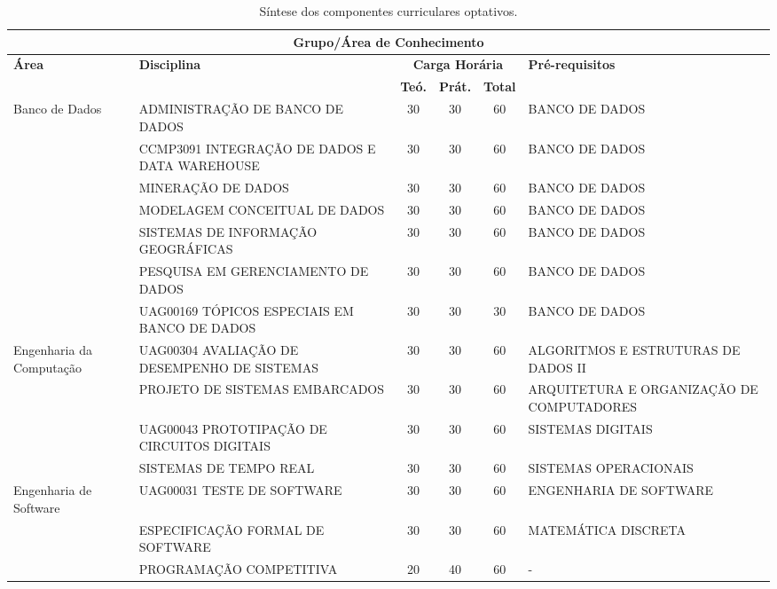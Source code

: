 \begin{center}
  
  \begin{tiny}
    \begin{longtable}{p{2.5cm}p{5.5cm}cccp{3.3cm}}
      \caption{\label{quadro:sintese-componentes-curriculares-optativos}Síntese dos componentes curriculares optativos.}\\
    \toprule
    \multicolumn{6}{c}{\textbf{Grupo/Área de Conhecimento}} \\ \midrule
    \textbf{Área} & \textbf{Disciplina} & \multicolumn{3}{c}{\textbf{Carga Horária}} & \textbf{Pré-requisitos} \\
    & & \textbf{Teó.} & \textbf{Prát.} & \textbf{Total} & \\
    \midrule
  Banco de Dados & ADMINISTRAÇÃO DE BANCO DE DADOS & 30 & 30 & 60 & BANCO DE DADOS \\ \cline{2-6}
    & CCMP3091 INTEGRAÇÃO DE DADOS E DATA WAREHOUSE & 30 & 30 & 60 & BANCO DE DADOS \\ \cline{2-6}
    & MINERAÇÃO DE DADOS & 30 & 30 & 60 & BANCO DE DADOS \\ \cline{2-6}
    & MODELAGEM CONCEITUAL DE DADOS & 30 & 30 & 60 & BANCO DE DADOS \\ \cline{2-6}
    & SISTEMAS DE INFORMAÇÃO GEOGRÁFICAS & 30 & 30 & 60 & BANCO DE DADOS \\ \cline{2-6}
    & PESQUISA EM GERENCIAMENTO DE DADOS & 30 & 30 & 60 & BANCO DE DADOS \\ \cline{2-6}
    & UAG00169 TÓPICOS ESPECIAIS EM BANCO DE DADOS & 30 & 30 & 30 & BANCO DE DADOS \\ \midrule
  Engenharia da Computação & UAG00304 AVALIAÇÃO DE DESEMPENHO DE SISTEMAS & 30 & 30 & 60 & ALGORITMOS E ESTRUTURAS DE DADOS II \\ \cline{2-6}
    & PROJETO DE SISTEMAS EMBARCADOS & 30 & 30 & 60 & ARQUITETURA E ORGANIZAÇÃO DE COMPUTADORES \\ \cline{2-6}
    & UAG00043 PROTOTIPAÇÃO DE CIRCUITOS DIGITAIS & 30 & 30 & 60 & SISTEMAS DIGITAIS \\ \cline{2-6}
    & SISTEMAS DE TEMPO REAL & 30 & 30 & 60 & SISTEMAS OPERACIONAIS \\ \midrule
    Engenharia de Software & UAG00031 TESTE DE SOFTWARE & 30 & 30 & 60 & ENGENHARIA DE SOFTWARE \\ \cline{2-6}
    & ESPECIFICAÇÃO FORMAL DE SOFTWARE & 30 & 30 & 60 & MATEMÁTICA DISCRETA \\ \cline{2-6}
    & PROGRAMAÇÃO COMPETITIVA & 20 & 40 & 60 & - \\ \cline{2-6}

\end{longtable}
\end{tiny}
\end{center}
